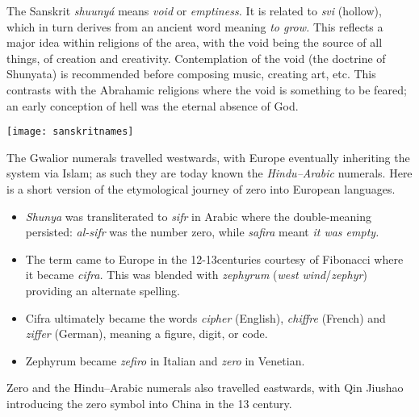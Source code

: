 \begin{minipage}[t]{0.59\linewidth}\vspace{-5pt}
The Sanskrit \emph{shuunyá} means \emph{void} or \emph{emptiness.} It is related to \emph{svi} (hollow), which in turn derives from an ancient word meaning \emph{to grow.} This reflects a major idea within religions of the area, with the void being the source of all things, of creation and creativity. Contemplation of the void (the doctrine of Shunyata) is recommended before composing music, creating art, etc. This contrasts with the Abrahamic religions where the void is something to be feared; an early conception of hell was the eternal absence of God.
\end{minipage}\hfill\begin{minipage}[t]{0.4\linewidth}\vspace{-13pt}
\flushright\texttt{[image: sanskritnames]}
\end{minipage}\smallbreak
The Gwalior numerals travelled westwards, with Europe eventually inheriting the system via Islam; as such they are today known the \emph{Hindu--Arabic} numerals. Here is a short version of the etymological journey of zero into European languages.
\begin{itemize}
  \item \emph{Shunya} was transliterated to \emph{sifr} in Arabic where the double-meaning persisted: \emph{al-sifr} was the number zero, while \emph{safira} meant \emph{it was empty.}
  \item The term came to Europe in the 12\th{}-13\th centuries courtesy of Fibonacci where it became \emph{cifra.} This was blended with \emph{zephyrum} (\emph{west wind}/\emph{zephyr}) providing an alternate spelling.
  \item Cifra ultimately became the words \emph{cipher} (English), \emph{chiffre} (French) and \emph{ziffer} (German), meaning a figure, digit, or code.
  \item Zephyrum became \emph{zefiro} in Italian and \emph{zero} in Venetian.
\end{itemize}
Zero and the Hindu--Arabic numerals also travelled eastwards, with Qin Jiushao introducing the zero symbol into China in the 13\th{} century.\bigbreak

